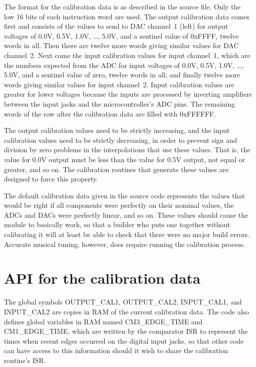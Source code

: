 The format for the calibration data is as described in the source file. 
Only the low 16 bits of each instruction word are used.  The output
calibration data comes first and consists of the values to send to DAC
channel~1 (left) for output voltages of 0.0V, 0.5V, 1.0V, \ldots, 5.0V, and
a sentinel value of 0xFFFF, twelve words in all.  Then there are twelve more
words giving similar values for DAC channel~2.  Next come the input
calibration values for input channel~1, which are the numbers expected from
the ADC for input voltages of 0.0V, 0.5V, 1.0V, \ldots, 5.0V, and a sentinel
value of zero, twelve words in all; and finally twelve more words giving
similar values for input channel~2.  Input calibration values are greater
for lower voltages because the inputs are processed by inverting amplifiers
between the input jacks and the microcontroller's ADC pins.  The remaining
words of the row after the calibration data are filled with 0xFFFFFF.

The output calibration values need to be strictly increasing, and the input
calibration values need to be strictly decreasing, in order to prevent
sign and division by zero problems in the interpolations that use these
values.  That is, the value for 0.0V output must be less than the value for
0.5V output, not equal or greater, and so on.  The calibration routines
that generate these values are designed to force this property.

The default calibration data given in the source code represents the values
that would be right if all components were perfectly on their nominal
values, the ADCs and DACs were perfectly linear, and so on.  These values
should cause the module to basically work, so that a builder who puts one
together without calibrating it will at least be able to check that there
were no major build errors.  Accurate musical tuning, however, does require
running the calibration process.

\section{API for the calibration data}

The global symbols OUTPUT\_CAL1, OUTPUT\_CAL2, INPUT\_CAL1, and INPUT\_CAL2
are copies in RAM of the current calibration data.  The code also defines
global variables in RAM named CM3\_EDGE\_TIME and CM1\_EDGE\_TIME, which are
written by the comparator ISR to represent the times when
recent edges occurred on the digital input jacks, so that other code can have
access to this information should it wish to share the calibration routine's
ISR.

